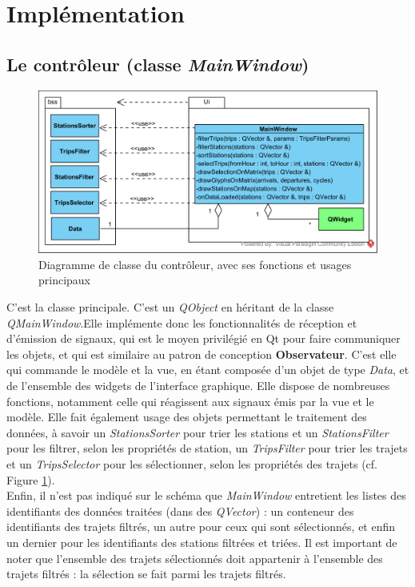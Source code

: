 \documentclass[12pt]{article}
\begin{document}
	
	\newpage
	\section{Implémentation}
		\subsection{Le contrôleur (classe \textit{MainWindow})}
		\begin{figure}[!h]
		\begin{center}
		\includegraphics[scale=1]{class_diagram_controleur.png}
		\caption{Diagramme de classe du contrôleur, avec ses fonctions et usages principaux}
		\label{fig:dia_controleur}
		\end{center}
		\end{figure}
					
		C’est la classe principale. C’est un \textit{QObject} en héritant de la classe \textit{QMainWindow}.Elle implémente donc les fonctionnalités de réception et d’émission de signaux, qui est le moyen privilégié en Qt pour faire communiquer les objets, et qui est similaire au patron de conception \textbf{Observateur}. C’est elle qui commande le modèle et la vue, en étant composée d’un objet de type \textit{Data}, et de l’ensemble des widgets de l’interface graphique. Elle dispose de nombreuses fonctions, notamment celle qui réagissent aux signaux émis par la vue et le modèle. Elle fait également usage des objets permettant le traitement des données, à savoir un \textit{StationsSorter} pour trier les stations et un \textit{StationsFilter} pour les filtrer, selon les propriétés de station, un \textit{TripsFilter} pour trier les trajets et un \textit{TripsSelector} pour les sélectionner, selon les propriétés des trajets (cf. Figure \ref{fig:dia_controleur}).\\
	
	Enfin, il n’est pas indiqué sur le schéma que \textit{MainWindow} entretient les listes des identifiants des données traitées (dans des \textit{QVector}) : un conteneur des identifiants des trajets filtrés, un autre pour ceux qui sont sélectionnés, et enfin un dernier pour les identifiants des stations filtrées et triées. Il est important de noter que l’ensemble des trajets sélectionnés doit appartenir à l’ensemble des trajets filtrés : la sélection se fait parmi les trajets filtrés.
		
\end{document}
